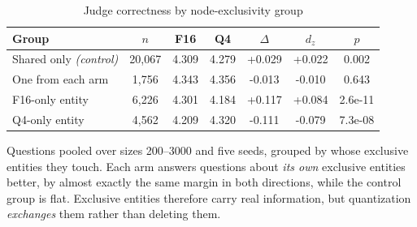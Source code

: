 \begin{table}[t]
\centering
\caption{Judge correctness by node-exclusivity group}
\label{tab:nodeexcl}
\footnotesize
\setlength{\tabcolsep}{2pt}
\begin{tabular}{lcccccc}
\toprule
\textbf{Group} & $n$ & \textbf{F16} & \textbf{Q4} & \textbf{$\Delta$} & \textbf{$d_z$} & \textbf{$p$} \\
\midrule
Shared only \emph{(control)} & 20{,}067 & 4.309 & 4.279 & +0.029 & +0.022 & 0.002 \\
\rowcolor{gray!10}One from each arm & 1{,}756 & 4.343 & 4.356 & -0.013 & -0.010 & 0.643 \\
F16-only entity & 6{,}226 & 4.301 & 4.184 & +0.117 & +0.084 & 2.6e-11 \\
\rowcolor{gray!10}Q4-only entity & 4{,}562 & 4.209 & 4.320 & -0.111 & -0.079 & 7.3e-08 \\
\bottomrule
\end{tabular}
\parbox[t]{0.485\textwidth}{\vspace{0.1cm}Questions pooled over sizes 200--3000 and five seeds, grouped by whose exclusive entities they touch. Each arm answers questions about \emph{its own} exclusive entities better, by almost exactly the same margin in both directions, while the control group is flat. Exclusive entities therefore carry real information, but quantization \emph{exchanges} them rather than deleting them.}
\end{table}
